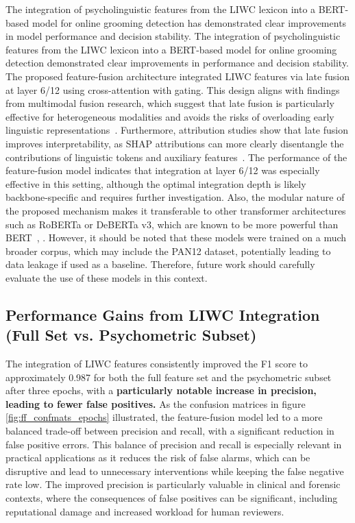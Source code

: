 The integration of psycholinguistic features from the LIWC lexicon into a BERT-based model for online grooming detection has demonstrated clear improvements in model performance and decision stability. The integration of psycholinguistic features from the LIWC lexicon into a BERT-based model for online grooming detection demonstrated clear improvements in performance and decision stability. The proposed feature-fusion architecture integrated LIWC features via late fusion at layer 6/12 using cross-attention with gating. This design aligns with findings from multimodal fusion research, which suggest that late fusion is particularly effective for heterogeneous modalities and avoids the risks of overloading early linguistic representations~\cite{shankar2022progressivefusion}. Furthermore, attribution studies show that late fusion improves interpretability, as SHAP attributions can more clearly disentangle the contributions of linguistic tokens and auxiliary features~\cite{shapcat2024interpretable}. The performance of the feature-fusion model indicates that integration at layer 6/12 was especially effective in this setting, although the optimal integration depth is likely backbone-specific and requires further investigation. Also, the modular nature of the proposed mechanism makes it transferable to other transformer architectures such as RoBERTa or DeBERTa v3, which are known to be more powerful than BERT~\cite{liu2019roberta}, \cite{he2023debertav3}. However, it should be noted that these models were trained on a much broader corpus, which may include the PAN12 dataset, potentially leading to data leakage if used as a baseline. Therefore, future work should carefully evaluate the use of these models in this context.

\subsection{Performance Gains from LIWC Integration (Full Set vs. Psychometric Subset)}

The integration of LIWC features consistently improved the F1 score to approximately 0.987 for both the full feature set and the psychometric subset after three epochs, with a \textbf{particularly notable increase in precision, leading to fewer false positives.} As the confusion matrices in figure \ref{fig:ff_confmats_epochs} illustrated, the feature-fusion model led to a more balanced trade-off between precision and recall, with a significant reduction in false positive errors. This balance of precision and recall is especially relevant in practical applications as it reduces the risk of false alarms, which can be disruptive and lead to unnecessary interventions while keeping the false negative rate low. The improved precision is particularly valuable in clinical and forensic contexts, where the consequences of false positives can be significant, including reputational damage and increased workload for human reviewers.

